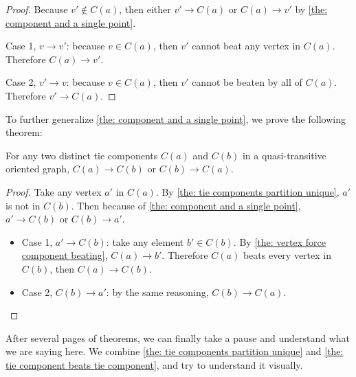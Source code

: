\begin{proof}
  Because \(v' \notin C(a)\),
  then either \(v' \to C(a)\) or \(C(a) \to v'\)
  by \cref{the: component and a single point}.

  Case 1, \(v \to v'\): because \(v \in C(a)\),
  then \(v'\) cannot beat any vertex in \(C(a)\).
  Therefore \(C(a) \to v'\).

  Case 2, \(v' \to v\): because \(v \in C(a)\),
  then \(v'\) cannot be beaten by all of \(C(a)\).
  Therefore \(v' \to C(a)\).
\end{proof}

To further generalize \cref{the: component and a single point},
we prove the following theorem:

\begin{theorem}\label{the: tie component beats tie component}
  For any two distinct tie components \(C(a)\) and \(C(b)\)
  in a quasi-transitive oriented graph,
  \(C(a) \to C(b)\) or \(C(b) \to C(a)\).
\end{theorem}

\begin{proof}
  Take any vertex \(a'\) in \(C(a)\).
  By \cref{the: tie components partition unique}, \(a'\) is not in \(C(b)\).
  Then because of \cref{the: component and a single point},
  \(a' \to C(b)\) or \(C(b) \to a'\).

  \begin{itemize}
    \item
      Case 1, \(a' \to C(b)\): take any element \(b' \in C(b)\).
      By \cref{the: vertex force component beating}, \(C(a) \to b'\).
      Therefore \(C(a)\) beats every vertex in \(C(b)\),
      then \(C(a) \to C(b)\).
    \item
      Case 2, \(C(b) \to a'\):
      by the same reasoning, \(C(b) \to C(a)\).
  \end{itemize}
\end{proof}

After several pages of theorems,
we can finally take a pause
and understand what we are saying here.
We combine \cref{the: tie components partition unique} and
\cref{the: tie component beats tie component},
and try to understand it visually.

